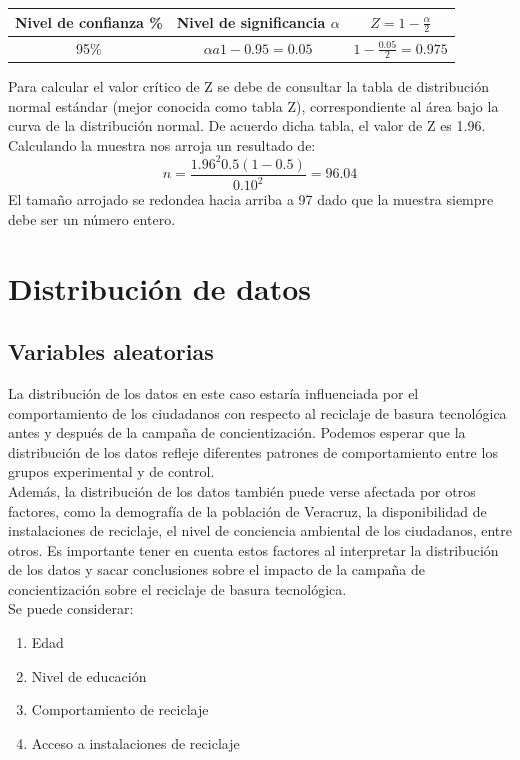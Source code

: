 \documentclass[letterpaper,12pt]{article}
\begin{document}
\begin{sloppypar}
\begin{center}
    \begin{tabular}[H]{|c|c|c|}\hline
        Nivel de confianza \% & Nivel de significancia $\alpha$ & $Z = 1 - \frac{\alpha}{2}$ \\  \hline
        95\% & $ \alpha a 1 - 0.95 = 0.05$ & $1 - \frac{0.05}{2} = 0.975$ \\ \hline
    \end{tabular}
\end{center}
Para calcular el valor crítico de Z se debe de consultar la tabla de distribución normal estándar (mejor conocida como tabla Z), correspondiente al área bajo la curva de la distribución normal. De acuerdo dicha tabla, el valor de Z es 1.96.
\vspace{0.3cm}\\ 
Calculando la muestra nos arroja un resultado de:
$$ n = \frac{{1.96}^{2}0.5(1-0.5)}{{0.10}^{2}} = 96.04$$
El tamaño arrojado se redondea hacia arriba a 97 dado que la muestra siempre debe ser un número entero.

\section{Distribución de datos}
\subsection{Variables aleatorias}
La distribución de los datos en este caso estaría influenciada por el comportamiento de los ciudadanos con respecto al reciclaje de basura tecnológica antes y después de la campaña de concientización. Podemos esperar que la distribución de los datos refleje diferentes patrones de comportamiento entre los grupos experimental y de control.
\vspace{0.3cm}\\
Además, la distribución de los datos también puede verse afectada por otros factores, como la demografía de la población de Veracruz, la disponibilidad de instalaciones de reciclaje, el nivel de conciencia ambiental de los ciudadanos, entre otros. Es importante tener en cuenta estos factores al interpretar la distribución de los datos y sacar conclusiones sobre el impacto de la campaña de concientización sobre el reciclaje de basura tecnológica.
\vspace{0.3cm}\\ 
Se puede considerar:
\begin{enumerate}
    \item Edad 
    \item Nivel de educación
    \item Comportamiento de reciclaje
    \item Acceso a instalaciones de reciclaje
\end{enumerate}

\end{sloppypar}
\end{document}
